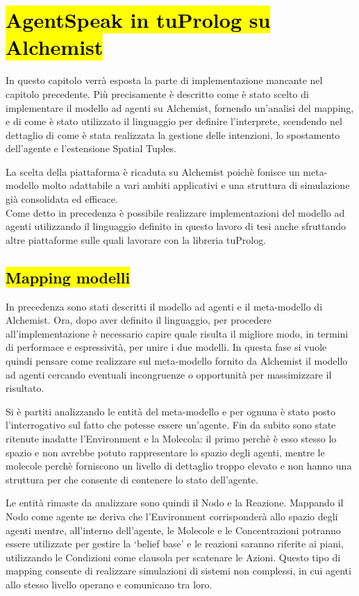 \chapter{\hl{AgentSpeak in tuProlog su Alchemist}}
In questo capitolo verrà esposta la parte di implementazione mancante nel capitolo precedente. Più precisamente è descritto come è stato scelto di implementare il modello ad agenti su Alchemist, fornendo un'analisi del mapping, e di come è stato utilizzato il linguaggio per definire l'interprete, scendendo nel dettaglio di come è stata realizzata la gestione delle intenzioni, lo spostamento dell'agente e l'estensione Spatial Tuples.

La scelta della piattaforma è ricaduta su Alchemist poichè fonisce un meta-modello molto adattabile a vari ambiti applicativi e una struttura di simulazione già consolidata ed efficace.
\\
Come detto in precedenza è possibile realizzare implementazioni del modello ad agenti utilizzando il linguaggio definito in questo lavoro di tesi anche sfruttando altre piattaforme sulle quali lavorare con la libreria tuProlog.

\section{\hl{Mapping modelli}}\label{sctn:mapping}
In precedenza sono stati descritti il modello ad agenti e il meta-modello di Alchemist. Ora, dopo aver definito il linguaggio, per procedere all'implementazione è necessario capire quale risulta il migliore modo, in termini di performace e espressività, per unire i due modelli.
In questa fase si vuole quindi pensare come realizzare sul meta-modello fornito da Alchemist il modello ad agenti cercando eventuali incongruenze o opportunità per massimizzare il risultato.

Si è partiti analizzando le entità del meta-modello e per ognuna è stato posto l'interrogativo sul fatto che potesse essere un'agente.
Fin da subito sono state ritenute inadatte l'Environment e la Molecola: il primo perchè è esso stesso lo spazio e non avrebbe potuto rappresentare lo spazio degli agenti, mentre le molecole perchè forniscono un livello di dettaglio troppo elevato e non hanno una struttura per che consente di contenere lo stato dell'agente.

Le entità rimaste da analizzare sono quindi il Nodo e la Reazione. Mappando il Nodo come agente ne deriva che l'Environment corrisponderà allo spazio degli agenti mentre, all'interno dell'agente, le Molecole e le Concentrazioni potranno essere utilizzate per gestire la `belief base' e le reazioni saranno riferite ai piani, utilizzando le Condizioni come clausola per scatenare le Azioni. Questo tipo di mapping consente di realizzare simulazioni di sistemi non complessi, in cui agenti allo stesso livello operano e comunicano tra loro.

